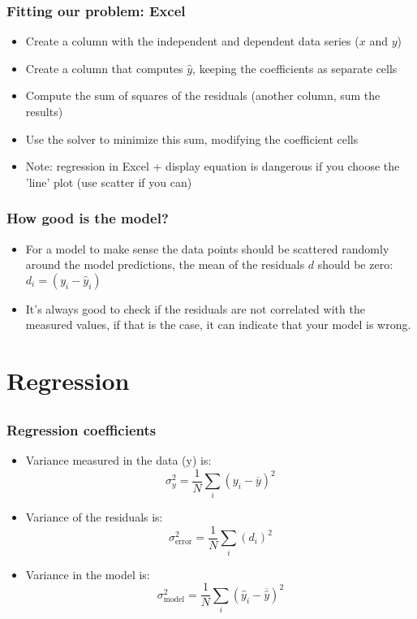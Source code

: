 \begin{frame}[fragile] 
  \frametitle{Fitting our problem: Excel}
    \begin{itemize}
      \item Create a column with the independent and dependent data series ($x$ and $y$)
      \item Create a column that computes $\hat{y}$, keeping the coefficients as separate cells
      \item Compute the sum of squares of the residuals (another column, sum the results)
      \item Use the solver to minimize this sum, modifying the coefficient cells
      \item Note: regression in Excel + display equation is dangerous if you choose the 'line' plot (use scatter if you can)
    \end{itemize}
\end{frame}

\begin{frame}[fragile] 
  \frametitle{How good is the model?}
  

  \begin{itemize}
    \item For a model to make sense the data points should be scattered randomly around the model predictions, the mean of the residuals $d$ should be zero: $d_i = \left( y_i - \hat{y}_i\right)$
    \item It’s always good to check if the residuals are not correlated with the measured values, if that is the case, it can indicate that your model is wrong.
  \end{itemize}
\end{frame}

\section{Regression}
\subsection*{}
\begin{frame}[fragile] 
  \frametitle{Regression coefficients}
    \begin{itemize}
    \item Variance measured in the data (y) is:
    \[
      \sigma^2_y = \frac{1}{N} \sum_i \left (y_i - \overline{y}\right)^2
    \]
    \item Variance of the residuals is:
    \[
      \sigma^2_\text{error} = \frac{1}{N} \sum_i \left (d_i\right)^2
    \]
        \item Variance in the model is:
    \[
      \sigma^2_\text{model} = \frac{1}{N} \sum_i \left (\hat{y}_i - \overline{\hat{y}}\right)^2
    \]
  \end{itemize}
\end{frame}

